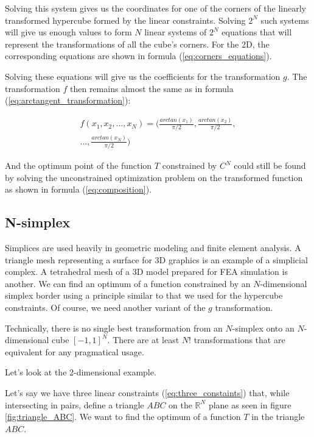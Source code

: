 \documentclass[
	a4paper, %
	10pt, %
	unnumberedsections, %
	twoside, %
]{LTJournalArticle}
\begin{document}
Solving this system gives us the coordinates for one of the corners of the linearly transformed hypercube formed by the linear constraints. Solving $2^N$ such systems will give us enough values to form $N$ linear systems of $2^N$ equations that will represent the transformations of all the cube's corners. For the 2D, the corresponding equations are shown in formula (\ref{eq:corners_equations}).

Solving these equations will give us the coefficients for the transformation $g$. The transformation $f$ then remains almost the same as in formula (\ref{eq:arctangent_transformation}):

\begin{equation}
	\begin{split}
	f(x_1, x_2, ..., x_N) = (\frac{arctan(x_1)}{\pi / 2}, \frac{arctan(x_2)}{\pi / 2}, \\
	..., \frac{arctan(x_N)}{\pi / 2})
	\end{split}
	\label{eq:nd_arctangent_transformation}
\end{equation}

And the optimum point of the function $T$ constrained by $C^N$ could still be found by solving the unconstrained optimization problem on the transformed function as shown in formula (\ref{eq:composition}).

\subsection{N-simplex}
Simplices are used heavily in geometric modeling and finite element analysis. A triangle mesh representing a surface for 3D graphics is an example of a simplicial complex. A tetrahedral mesh of a 3D model prepared for FEA simulation is another. We can find an optimum of a function constrained by an $N$-dimensional simplex border using a principle similar to that we used for the hypercube constraints. Of course, we need another variant of the $g$ transformation.

Technically, there is no single best transformation from an $N$-simplex onto an $N$-dimensional cube $[-1, 1]^N$. There are at least $N!$ transformations that are equivalent for any pragmatical usage.

Let's look at the 2-dimensional example.

Let's say we have three linear constraints (\ref{eq:three_constaints}) that, while intersecting in pairs, define a triangle $ABC$ on the $\mathbb{R}^N$ plane as seen in figure \ref{fig:triangle_ABC}. We want to find the optimum of a function $T$ in the triangle $ABC$.
\end{document}
